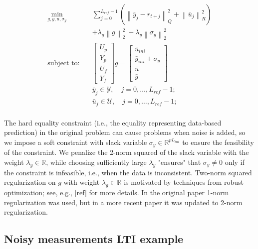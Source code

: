 \documentclass[12pt,a4paper]{report}
\newcommand{\norm}[1]{\left\lVert #1 \right\rVert}
\begin{document}
\begin{equation}
    \begin{aligned}
        \min_{g,y,u, \sigma_y} \quad  &\sum_{j=0}^{L_{ref}-1} \left(\norm{\bar{y}_j - r_{t+j}}^{2}_{Q} + \norm{\bar{u}_j}^{2}_{R}\right) \\
        &+ \lambda_g\norm{g}_2^{2}\ + \lambda_y\norm{\sigma_y}_2^{2}\\
        \text{subject to:} \quad & \begin{bmatrix} U_p \\ Y_p \\ U_f \\ Y_f\end{bmatrix}g = \begin{bmatrix} \bar{u}_{ini} \\ \bar{y}_{ini} + \sigma_y \\ \bar{u} \\ \bar{y}\end{bmatrix}\\
        &\bar{y}_j \in \mathcal{Y}, \quad j=0,\dots,L_{ref}-1; \\
        &\bar{u}_j \in \mathcal{U}, \quad j=0,\dots,L_{ref}-1; \\
    \end{aligned}
    \label{eq:deepc-reg}
\end{equation}

The hard equality constraint (i.e., the equality representing data-based prediction) in the original problem can cause problems when noise is added, so we impose a soft constraint with slack variable $\sigma_y \in \mathbb{R}^{pL_{ini}}$
to ensure the feasibility of the constraint. We penalize the 2-norm squared of the slack variable with the weight $\lambda_y \in \mathbb{R}$, while choosing sufficiently large $\lambda_y$ "ensures" that $\sigma_y \neq 0$ only if the constraint
is infeasible, i.e., when the data is inconsistent. Two-norm squared regularization on $g$ with weight $\lambda_g \in \mathbb{R}$ is motivated by techniques from robust optimization; see, e.g., [ref] for more details.
In the original paper \cite{coulson2019data} 1-norm regularization was used, but in a more recent paper \cite{huang2019deepcconverters} it was updated to 2-norm regularization.

\subsection{Noisy measurements LTI example}
\end{document}
